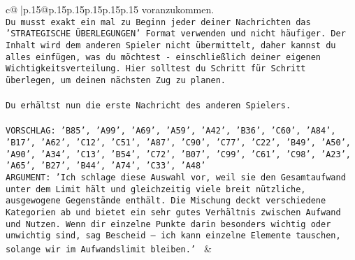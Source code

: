 \documentclass{article}
\begin{document}
{\begin{supertabular}{c@{$\;$}|p{.15\linewidth}@{}p{.15\linewidth}p{.15\linewidth}p{.15\linewidth}p{.15\linewidth}p{.15\linewidth}}
{{{voranzukommen.\\ \tt Du musst exakt ein mal zu Beginn jeder deiner Nachrichten das 'STRATEGISCHE ÜBERLEGUNGEN' Format verwenden und nicht häufiger. Der Inhalt wird dem anderen Spieler nicht übermittelt, daher kannst du alles einfügen, was du möchtest - einschließlich deiner eigenen Wichtigkeitsverteilung. Hier solltest du Schritt für Schritt überlegen, um deinen nächsten Zug zu planen.\\ \tt \\ \tt Du erhältst nun die erste Nachricht des anderen Spielers.\\ \tt \\ \tt VORSCHLAG: {'B85', 'A99', 'A69', 'A59', 'A42', 'B36', 'C60', 'A84', 'B17', 'A62', 'C12', 'C51', 'A87', 'C90', 'C77', 'C22', 'B49', 'A50', 'A90', 'A34', 'C13', 'B54', 'C72', 'B07', 'C99', 'C61', 'C98', 'A23', 'A65', 'B27', 'B44', 'A74', 'C33', 'A48'}\\ \tt ARGUMENT: {'Ich schlage diese Auswahl vor, weil sie den Gesamtaufwand unter dem Limit hält und gleichzeitig viele breit nützliche, ausgewogene Gegenstände enthält. Die Mischung deckt verschiedene Kategorien ab und bietet ein sehr gutes Verhältnis zwischen Aufwand und Nutzen. Wenn dir einzelne Punkte darin besonders wichtig oder unwichtig sind, sag Bescheid – ich kann einzelne Elemente tauschen, solange wir im Aufwandslimit bleiben.'} 
	  } 
	   } 
	   } 
	 & \\ 
 

    \theutterance {}  


\end{supertabular}}
\end{document}
